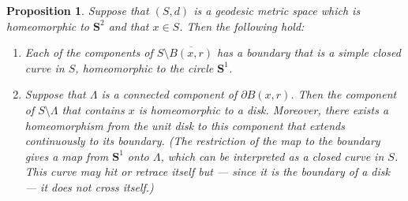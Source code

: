 \documentclass[JEP,XML,SOM,Unicode]{cedram}
\theoremstyle{plain}
\numberwithin{theorem}{section}
\newtheorem{proposition}[theorem]{Proposition}
\theoremstyle{definition}
\renewcommand{\S}{{\mathbf S}}
\let\ol\overline
\begin{document}
\begin{proposition}
\label{prop::boundariesarecircles}
Suppose that $(S, d)$ is a geodesic metric space which is homeomorphic to $\S^2$ and that $x \in S$. Then the following hold:
\begin{enumerate}
\item Each of the components of $S \setminus \ol{B(x,r)}$ has a boundary that is a simple closed curve in $S$, homeomorphic to the circle $\S^1$.
\item Suppose that $\Lambda$ is a connected component of $\partial B(x,r)$. Then the component of \hbox{$S \setminus \Lambda$} that contains $x$ is homeomorphic to a disk. Moreover, there exists a homeomorphism from the unit disk to this component that extends continuously to its boundary. (The restriction of the map to the boundary gives a map from $\S^1$ onto $\Lambda$, which can be interpreted as a closed curve in $S$. This curve may hit or retrace itself but --- since it is the boundary of a disk --- it does not cross itself.)
\end{enumerate}

\end{proposition}
\end{document}
